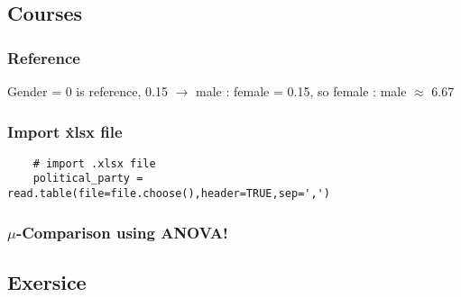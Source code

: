 \subsection{Courses}
\lstset{language=R}

\subsubsection{Reference}
Gender = 0 is reference, 0.15 $\rightarrow$ male : female = 0.15, so female : male $\approx$ 6.67

\subsubsection{Import \.xlsx file}
\begin{lstlisting}
    # import .xlsx file
    political_party = read.table(file=file.choose(),header=TRUE,sep=',')
\end{lstlisting}

\subsubsection{$\mu$-Comparison using ANOVA!}

\subsection{Exersice}

